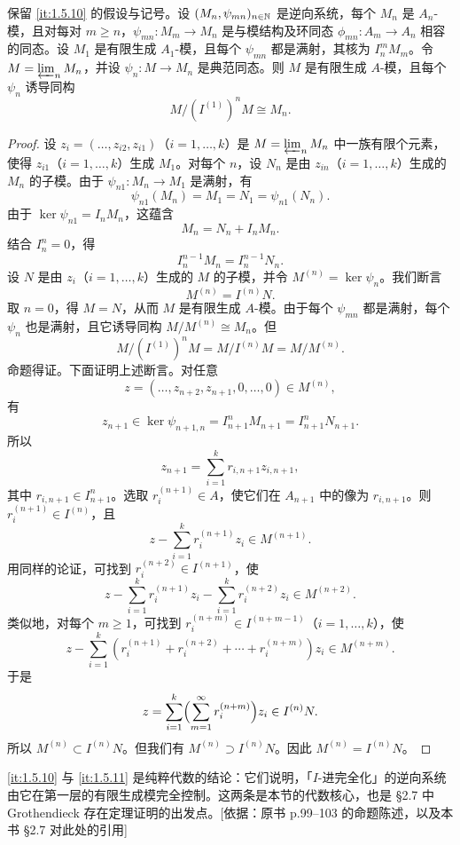 \begin{proposition}\label{it:1.5.11}
保留 \ref{it:1.5.10} 的假设与记号。设 $(M_n,\psi_{mn})_{n\in\mathbb{N}}$ 是逆向系统，每个 $M_n$ 是 $A_n$-模，且对每对 $m\ge n$，$\psi_{mn}\colon M_m\to M_n$ 是与模结构及环同态 $\phi_{mn}\colon A_m\to A_n$ 相容的同态。设 $M_1$ 是有限生成 $A_1$-模，且每个 $\psi_{mn}$ 都是满射，其核为 $I_n^mM_m$。令 $M=\varprojlim_n M_n$，并设 $\psi_n\colon M\to M_n$ 是典范同态。则 $M$ 是有限生成 $A$-模，且每个 $\psi_n$ 诱导同构
\[
M/(I^{(1)})^nM\cong M_n.
\]
\end{proposition}

\begin{proof}
设 $z_i=(\dots,z_{i2},z_{i1})$（$i=1,\dots,k$）是 $M=\varprojlim_n M_n$ 中一族有限个元素，使得 $z_{i1}$（$i=1,\dots,k$）生成 $M_1$。对每个 $n$，设 $N_n$ 是由 $z_{in}$（$i=1,\dots,k$）生成的 $M_n$ 的子模。由于 $\psi_{n1}\colon M_n\to M_1$ 是满射，有
\[
\psi_{n1}(M_n)=M_1=N_1=\psi_{n1}(N_n).
\]
由于 $\ker\psi_{n1}=I_nM_n$，这蕴含
\[
M_n=N_n+I_nM_n.
\]
结合 $I_n^n=0$，得
\[
I_n^{n-1}M_n=I_n^{n-1}N_n.
\]
设 $N$ 是由 $z_i$（$i=1,\dots,k$）生成的 $M$ 的子模，并令 $M^{(n)}=\ker\psi_n$。我们断言
\[
M^{(n)}=I^{(n)}N.
\]
取 $n=0$，得 $M=N$，从而 $M$ 是有限生成 $A$-模。由于每个 $\psi_{mn}$ 都是满射，每个 $\psi_n$ 也是满射，且它诱导同构 $M/M^{(n)}\cong M_n$。但
\[
M/(I^{(1)})^nM=M/I^{(n)}M=M/M^{(n)}.
\]
命题得证。下面证明上述断言。对任意
\[
z=(\dots,z_{n+2},z_{n+1},0,\dots,0)\in M^{(n)},
\]
有
\[
z_{n+1}\in\ker\psi_{n+1,n}=I_{n+1}^nM_{n+1}=I_{n+1}^nN_{n+1}.
\]
所以
\[
z_{n+1}=\sum_{i=1}^{k}r_{i,n+1}z_{i,n+1},
\]
其中 $r_{i,n+1}\in I_{n+1}^n$。选取 $r_i^{(n+1)}\in A$，使它们在 $A_{n+1}$ 中的像为 $r_{i,n+1}$。则 $r_i^{(n+1)}\in I^{(n)}$，且
\[
z-\sum_{i=1}^{k}r_i^{(n+1)}z_i\in M^{(n+1)}.
\]
用同样的论证，可找到 $r_i^{(n+2)}\in I^{(n+1)}$，使
\[
z-\sum_{i=1}^{k}r_i^{(n+1)}z_i-\sum_{i=1}^{k}r_i^{(n+2)}z_i\in M^{(n+2)}.
\]
类似地，对每个 $m\ge 1$，可找到 $r_i^{(n+m)}\in I^{(n+m-1)}$（$i=1,\dots,k$），使
\[
z-\sum_{i=1}^{k}(r_i^{(n+1)}+r_i^{(n+2)}+\cdots+r_i^{(n+m)})z_i\in M^{(n+m)}.
\]
于是
\[
z=\sum_{i=1}^{k}\Bigl(\sum_{m=1}^{\infty}r_i^{(n+m)}\Bigr)z_i\in I^{(n)}N.
\]
所以 $M^{(n)}\subset I^{(n)}N$。但我们有 $M^{(n)}\supset I^{(n)}N$。因此 $M^{(n)}=I^{(n)}N$。
\end{proof}
\begin{tnote}
\ref{it:1.5.10} 与 \ref{it:1.5.11} 是纯粹代数的结论：它们说明，「$I$-进完全化」的逆向系统由它在第一层的有限生成模完全控制。这两条是本节的代数核心，也是 §2.7 中 Grothendieck 存在定理证明的出发点。[依据：原书 p.99–103 的命题陈述，以及本书 §2.7 对此处的引用]
\end{tnote}

